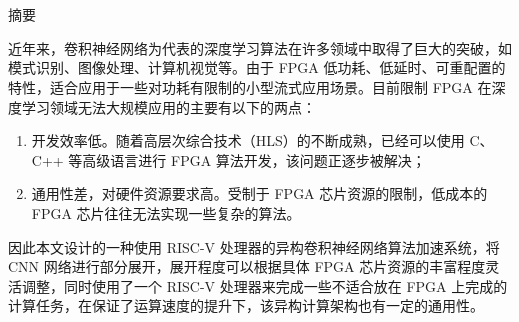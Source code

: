 \maketitle%
\chapter[摘要]{\MyTitleCh}
\setcounter{page}{1}%

\begin{center}
\vspace{-0.3cm}
 \songti 摘要
\vspace{0.3cm}
\end{center}

近年来，卷积神经网络为代表的深度学习算法在许多领域中取得了巨大的突破，如模式识别、图像处理、计算机视觉等。由于 FPGA 低功耗、低延时、可重配置的特性，适合应用于一些对功耗有限制的小型流式应用场景。目前限制 FPGA 在深度学习领域无法大规模应用的主要有以下的两点：

\begin{enumerate}
    \item 开发效率低。随着高层次综合技术（HLS）的不断成熟，已经可以使用 C、C++ 等高级语言进行 FPGA 算法开发，该问题正逐步被解决；

    \item 通用性差，对硬件资源要求高。受制于 FPGA 芯片资源的限制，低成本的 FPGA 芯片往往无法实现一些复杂的算法。
\end{enumerate}

因此本文设计的一种使用 RISC-V 处理器的异构卷积神经网络算法加速系统，将 CNN 网络进行部分展开，展开程度可以根据具体 FPGA 芯片资源的丰富程度灵活调整，同时使用了一个 RISC-V 处理器来完成一些不适合放在 FPGA 上完成的计算任务，在保证了运算速度的提升下，该异构计算架构也有一定的通用性。

